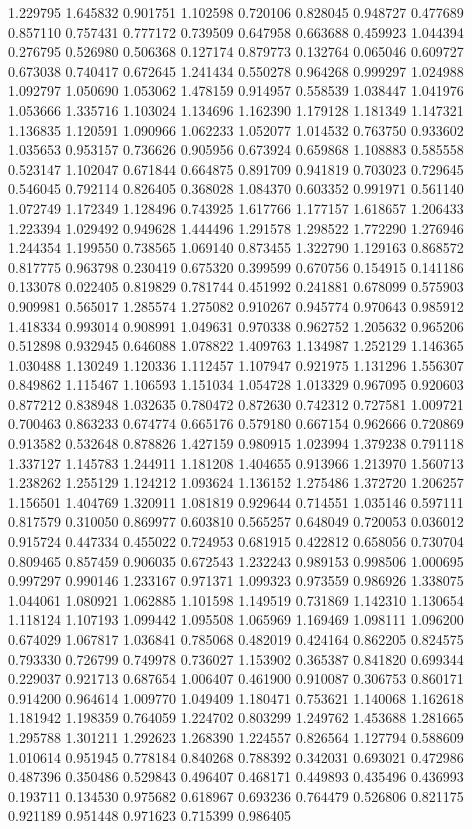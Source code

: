 1.229795
1.645832
0.901751
1.102598
0.720106
0.828045
0.948727
0.477689
0.857110
0.757431
0.777172
0.739509
0.647958
0.663688
0.459923
1.044394
0.276795
0.526980
0.506368
0.127174
0.879773
0.132764
0.065046
0.609727
0.673038
0.740417
0.672645
1.241434
0.550278
0.964268
0.999297
1.024988
1.092797
1.050690
1.053062
1.478159
0.914957
0.558539
1.038447
1.041976
1.053666
1.335716
1.103024
1.134696
1.162390
1.179128
1.181349
1.147321
1.136835
1.120591
1.090966
1.062233
1.052077
1.014532
0.763750
0.933602
1.035653
0.953157
0.736626
0.905956
0.673924
0.659868
1.108883
0.585558
0.523147
1.102047
0.671844
0.664875
0.891709
0.941819
0.703023
0.729645
0.546045
0.792114
0.826405
0.368028
1.084370
0.603352
0.991971
0.561140
1.072749
1.172349
1.128496
0.743925
1.617766
1.177157
1.618657
1.206433
1.223394
1.029492
0.949628
1.444496
1.291578
1.298522
1.772290
1.276946
1.244354
1.199550
0.738565
1.069140
0.873455
1.322790
1.129163
0.868572
0.817775
0.963798
0.230419
0.675320
0.399599
0.670756
0.154915
0.141186
0.133078
0.022405
0.819829
0.781744
0.451992
0.241881
0.678099
0.575903
0.909981
0.565017
1.285574
1.275082
0.910267
0.945774
0.970643
0.985912
1.418334
0.993014
0.908991
1.049631
0.970338
0.962752
1.205632
0.965206
0.512898
0.932945
0.646088
1.078822
1.409763
1.134987
1.252129
1.146365
1.030488
1.130249
1.120336
1.112457
1.107947
0.921975
1.131296
1.556307
0.849862
1.115467
1.106593
1.151034
1.054728
1.013329
0.967095
0.920603
0.877212
0.838948
1.032635
0.780472
0.872630
0.742312
0.727581
1.009721
0.700463
0.863233
0.674774
0.665176
0.579180
0.667154
0.962666
0.720869
0.913582
0.532648
0.878826
1.427159
0.980915
1.023994
1.379238
0.791118
1.337127
1.145783
1.244911
1.181208
1.404655
0.913966
1.213970
1.560713
1.238262
1.255129
1.124212
1.093624
1.136152
1.275486
1.372720
1.206257
1.156501
1.404769
1.320911
1.081819
0.929644
0.714551
1.035146
0.597111
0.817579
0.310050
0.869977
0.603810
0.565257
0.648049
0.720053
0.036012
0.915724
0.447334
0.455022
0.724953
0.681915
0.422812
0.658056
0.730704
0.809465
0.857459
0.906035
0.672543
1.232243
0.989153
0.998506
1.000695
0.997297
0.990146
1.233167
0.971371
1.099323
0.973559
0.986926
1.338075
1.044061
1.080921
1.062885
1.101598
1.149519
0.731869
1.142310
1.130654
1.118124
1.107193
1.099442
1.095508
1.065969
1.169469
1.098111
1.096200
0.674029
1.067817
1.036841
0.785068
0.482019
0.424164
0.862205
0.824575
0.793330
0.726799
0.749978
0.736027
1.153902
0.365387
0.841820
0.699344
0.229037
0.921713
0.687654
1.006407
0.461900
0.910087
0.306753
0.860171
0.914200
0.964614
1.009770
1.049409
1.180471
0.753621
1.140068
1.162618
1.181942
1.198359
0.764059
1.224702
0.803299
1.249762
1.453688
1.281665
1.295788
1.301211
1.292623
1.268390
1.224557
0.826564
1.127794
0.588609
1.010614
0.951945
0.778184
0.840268
0.788392
0.342031
0.693021
0.472986
0.487396
0.350486
0.529843
0.496407
0.468171
0.449893
0.435496
0.436993
0.193711
0.134530
0.975682
0.618967
0.693236
0.764479
0.526806
0.821175
0.921189
0.951448
0.971623
0.715399
0.986405
